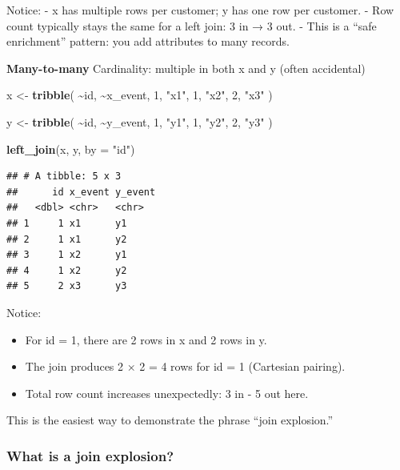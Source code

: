 \documentclass[
  11pt,
]{article}
\newenvironment{Shaded}{\begin{snugshade}}{\end{snugshade}}
\newcommand{\AttributeTok}[1]{\textcolor[rgb]{0.13,0.29,0.53}{#1}}
\newcommand{\DecValTok}[1]{\textcolor[rgb]{0.00,0.00,0.81}{#1}}
\newcommand{\FunctionTok}[1]{\textcolor[rgb]{0.13,0.29,0.53}{\textbf{#1}}}
\newcommand{\NormalTok}[1]{#1}
\newcommand{\OtherTok}[1]{\textcolor[rgb]{0.56,0.35,0.01}{#1}}
\newcommand{\SpecialCharTok}[1]{\textcolor[rgb]{0.81,0.36,0.00}{\textbf{#1}}}
\newcommand{\StringTok}[1]{\textcolor[rgb]{0.31,0.60,0.02}{#1}}
\providecommand{\tightlist}{%
  \setlength{\itemsep}{0pt}\setlength{\parskip}{0pt}}
\begin{document}
Notice: - x has multiple rows per customer; y has one row per customer.
- Row count typically stays the same for a left join: 3 in → 3 out. -
This is a ``safe enrichment'' pattern: you add attributes to many
records.

\textbf{Many-to-many} Cardinality: multiple in both x and y (often
accidental)

\begin{Shaded}
\begin{Highlighting}[]
\NormalTok{x }\OtherTok{\textless{}{-}} \FunctionTok{tribble}\NormalTok{(}
  \SpecialCharTok{\textasciitilde{}}\NormalTok{id, }\SpecialCharTok{\textasciitilde{}}\NormalTok{x\_event,}
   \DecValTok{1}\NormalTok{,  }\StringTok{"x1"}\NormalTok{,}
   \DecValTok{1}\NormalTok{,  }\StringTok{"x2"}\NormalTok{,}
   \DecValTok{2}\NormalTok{,  }\StringTok{"x3"}
\NormalTok{)}

\NormalTok{y }\OtherTok{\textless{}{-}} \FunctionTok{tribble}\NormalTok{(}
  \SpecialCharTok{\textasciitilde{}}\NormalTok{id, }\SpecialCharTok{\textasciitilde{}}\NormalTok{y\_event,}
   \DecValTok{1}\NormalTok{,  }\StringTok{"y1"}\NormalTok{,}
   \DecValTok{1}\NormalTok{,  }\StringTok{"y2"}\NormalTok{,}
   \DecValTok{2}\NormalTok{,  }\StringTok{"y3"}
\NormalTok{)}

\FunctionTok{left\_join}\NormalTok{(x, y, }\AttributeTok{by =} \StringTok{"id"}\NormalTok{)}
\end{Highlighting}
\end{Shaded}

\begin{verbatim}
## # A tibble: 5 x 3
##      id x_event y_event
##   <dbl> <chr>   <chr>  
## 1     1 x1      y1     
## 2     1 x1      y2     
## 3     1 x2      y1     
## 4     1 x2      y2     
## 5     2 x3      y3
\end{verbatim}

Notice:

\begin{itemize}
\tightlist
\item
  For id = 1, there are 2 rows in x and 2 rows in y.
\item
  The join produces 2 × 2 = 4 rows for id = 1 (Cartesian pairing).
\item
  Total row count increases unexpectedly: 3 in - 5 out here.
\end{itemize}

This is the easiest way to demonstrate the phrase ``join explosion.''

\subsubsection{What is a join
explosion?}\label{what-is-a-join-explosion}
\end{document}
